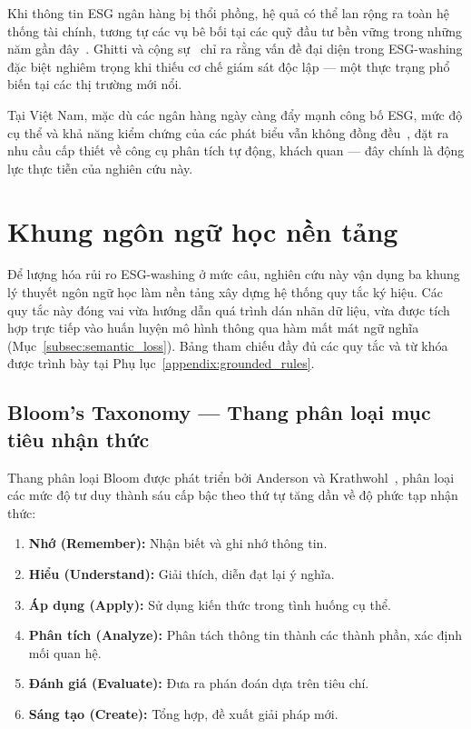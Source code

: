 Khi thông tin ESG ngân hàng bị thổi phồng, hệ quả có thể lan rộng ra toàn hệ thống tài chính, tương tự các vụ bê bối tại các quỹ đầu tư bền vững trong những năm gần đây~\cite{lipenkova2023detecting}. Ghitti và cộng sự~\cite{ghitti2024agency} chỉ ra rằng vấn đề đại diện trong ESG-washing đặc biệt nghiêm trọng khi thiếu cơ chế giám sát độc lập --- một thực trạng phổ biến tại các thị trường mới nổi.

Tại Việt Nam, mặc dù các ngân hàng ngày càng đẩy mạnh công bố ESG, mức độ cụ thể và khả năng kiểm chứng của các phát biểu vẫn không đồng đều~\cite{buchetti2025literature}, đặt ra nhu cầu cấp thiết về công cụ phân tích tự động, khách quan --- đây chính là động lực thực tiễn của nghiên cứu này.


\section{Khung ngôn ngữ học nền tảng}
\label{sec:linguistic_frameworks}

Để lượng hóa rủi ro ESG-washing ở mức câu, nghiên cứu này vận dụng ba khung lý thuyết ngôn ngữ học làm nền tảng xây dựng hệ thống quy tắc ký hiệu. Các quy tắc này đóng vai vừa hướng dẫn quá trình dán nhãn dữ liệu, vừa được tích hợp trực tiếp vào huấn luyện mô hình thông qua hàm mất mát ngữ nghĩa (Mục~\ref{subsec:semantic_loss}). Bảng tham chiếu đầy đủ các quy tắc và từ khóa được trình bày tại Phụ lục~\ref{appendix:grounded_rules}.


\subsection{Bloom's Taxonomy --- Thang phân loại mục tiêu nhận thức}
\label{subsec:bloom}

Thang phân loại Bloom được phát triển bởi Anderson và Krathwohl~\cite{anderson2001taxonomy}, phân loại các mức độ tư duy thành sáu cấp bậc theo thứ tự tăng dần về độ phức tạp nhận thức:

\begin{enumerate}
    \item \textbf{Nhớ (Remember):} Nhận biết và ghi nhớ thông tin.
    \item \textbf{Hiểu (Understand):} Giải thích, diễn đạt lại ý nghĩa.
    \item \textbf{Áp dụng (Apply):} Sử dụng kiến thức trong tình huống cụ thể.
    \item \textbf{Phân tích (Analyze):} Phân tách thông tin thành các thành phần, xác định mối quan hệ.
    \item \textbf{Đánh giá (Evaluate):} Đưa ra phán đoán dựa trên tiêu chí.
    \item \textbf{Sáng tạo (Create):} Tổng hợp, đề xuất giải pháp mới.
\end{enumerate}


